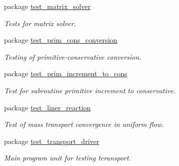 \begin{CompactItemize}
\item 
package \hyperlink{a00091}{test\_\-matrix\_\-solver}
\begin{CompactList}\small\item\em Tests for matrix solver. \item\end{CompactList}

\item 
package \hyperlink{a00092}{test\_\-prim\_\-cons\_\-conversion}
\begin{CompactList}\small\item\em Testing of primitive-conservative conversion. \item\end{CompactList}

\item 
package \hyperlink{a00093}{test\_\-prim\_\-increment\_\-to\_\-cons}
\begin{CompactList}\small\item\em Test for subroutine primitive increment to conservative. \item\end{CompactList}

\item 
package \hyperlink{a00090}{test\_\-liner\_\-reaction}
\begin{CompactList}\small\item\em Test of mass transport convergence in uniform flow. \item\end{CompactList}

\item 
package \hyperlink{a00095}{test\_\-transport\_\-driver}
\begin{CompactList}\small\item\em Main program unit for testing teransport. \item\end{CompactList}

\end{CompactItemize}
